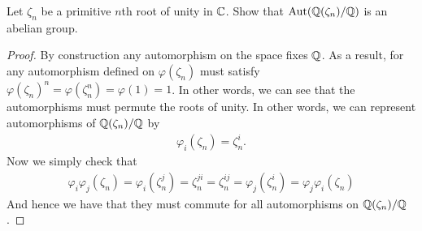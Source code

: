 \documentclass[num=10,duedate=04-14-21,course=Algebra\ II,proflastname=Walton]{hwtemplate}
\begin{document}
\problem[3]
\begin{claim}
	Let \(\zeta_n\) be a primitive \(n\)th root of unity in \(\mathbb{C}\). Show that \(\textrm{Aut}(\mathbb{Q}(\zeta_n)/\mathbb{Q})\) is an abelian group.
\end{claim}
\begin{proof}
	By construction any automorphism on the space fixes \(\mathbb{Q}\). As a result, for any automorphism defined on \(\varphi (\zeta_n)\) must satisfy \(\varphi (\zeta_n)^{n} = \varphi (\zeta_n ^{n}) = \varphi (1) = 1\). In other words, we can see that the automorphisms must permute the roots of unity. In other words, we can represent automorphisms of \(\mathbb{Q}(\zeta_n) / \mathbb{Q}\) by
	\begin{align*}
		\varphi_i (\zeta_n) = \zeta^{i}_n.
	\end{align*}
	Now we simply check that
	\begin{align*}
		\varphi_i\varphi_j(\zeta_n) = \varphi_i(\zeta^{j}_n) = \zeta^{ji}_n = \zeta^{ij}_n = \varphi_j (\zeta^{i}_n) = \varphi_j \varphi_i (\zeta _n)
	\end{align*}
	And hence we have that they must commute for all automorphisms on \(\mathbb{Q}(\zeta_n) / \mathbb{Q}\).
\end{proof}
\separator
\end{document}
